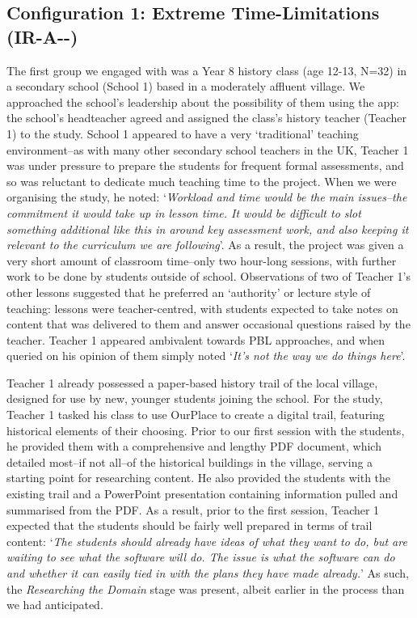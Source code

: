 \documentclass[,hyphens]{sigchi}
\begin{document}
\subsection{Configuration 1: Extreme Time-Limitations (IR-A-\--)}
The first group we engaged with was a Year 8 history class (age 12-13, N=32) in a secondary school (School 1) based in a moderately affluent village. We approached the school's leadership about the possibility of them using the app: the school's headteacher agreed and assigned the class's history teacher (Teacher 1) to the study. School 1 appeared to have a very `traditional' teaching environment--as with many other secondary school teachers in the UK, Teacher 1 was under pressure to prepare the students for frequent formal assessments, and so was reluctant to dedicate much teaching time to the project. When we were organising the study, he noted: `\textit{Workload and time would be the main issues--the commitment it would take up in lesson time. It would be difficult to slot something additional like this in around key assessment work, and also keeping it relevant to the curriculum we are following}'. As a result, the project was given a very short amount of classroom time--only two hour-long sessions, with further work to be done by students outside of school. Observations of two of Teacher 1's other lessons suggested that he preferred an `authority' or lecture style of teaching: lessons were teacher-centred, with students expected to take notes on content that was delivered to them and answer occasional questions raised by the teacher. Teacher 1 appeared ambivalent towards PBL approaches, and when queried on his opinion of them simply noted `\textit{It's not the way we do things here}'.

Teacher 1 already possessed a paper-based history trail of the local village, designed for use by new, younger students joining the school. For the study, Teacher 1 tasked his class to use OurPlace to create a digital trail, featuring historical elements of their choosing. Prior to our first session with the students, he provided them with a comprehensive and lengthy PDF document, which detailed most--if not all--of the historical buildings in the village, serving a starting point for researching content. He also provided the students with the existing trail and a PowerPoint presentation containing information pulled and summarised from the PDF. As a result, prior to the first session, Teacher 1 expected that the students should be fairly well prepared in terms of trail content: `\textit{The students should already have ideas of what they want to do, but are waiting to see what the software will do. The issue is what the software can do and whether it can easily tied in with the plans they have made already.}'  As such, the \textit{Researching the Domain} stage was present, albeit earlier in the process than we had anticipated. 
\end{document}
